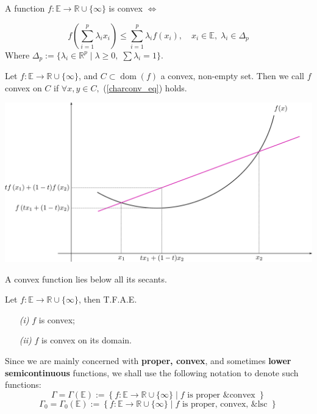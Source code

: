\documentclass{tufte-handout}
\DeclareMathOperator{\dom}{dom}
\begin{document}
{\begin{proposition}
 \end{proposition}
 \begin{proposition} \label{Jensens}
   A function $f: \mathbb{E} \to \mathbb{R} \cup \{ \infty \}$ is convex $\iff$  

   $$f \left( \sum^{p}_{i=1} \lambda_i x_i \right)\leq \sum^{p}_{i=1}\lambda_i f ( x_i), \quad x_i \in \mathbb{E},\; \lambda_i \in \Delta_p $$
  Where $\Delta_p :=\{ \lambda_i \in \mathbb{R}^p \mid \lambda \geq 0 , \; \sum \lambda_i = 1 \}$.
 \end{proposition}
 \begin{definition}
   Let $f: \mathbb{E}\to \mathbb{R} \cup \{\infty\}$, and $C \subset \dom(f)$ a convex, non-empty set. Then we call $f$ convex on $C$ if $\forall x, y \in C,$ (\ref{charconv_eq}) holds. 
\end{definition}
\begin{marginfigure}
  \includegraphics{convex}
  \caption{A convex function lies below all its secants.}
\end{marginfigure}
\begin{corollary} Let $f: \mathbb{E}\to \mathbb{R}\cup \{\infty\}$, then T.F.A.E. 
  \begin{enumerate}
    \item[\it (i)] $f$ is convex;
    \item[\it (ii)] $f$ is convex on its domain. 
  \end{enumerate} 
\end{corollary} 
\begin{remark}[Notation]
  Since we are mainly concerned with \textbf{proper, convex}, and sometimes \textbf{lower semicontinuous} functions, we shall use the following notation to denote such functions:
  $$\Gamma = \Gamma(\mathbb{E}) := \left\{ f: \mathbb{E} \to \mathbb{R} \cup \{\infty\} \mid f \text{ is proper \& convex } \right\} $$
  $$\Gamma_0 = \Gamma_0(\mathbb{E}) := \left\{ f: \mathbb{E} \to \mathbb{R} \cup \{\infty\} \mid f \text{ is proper, convex, \& lsc } \right\} $$


\end{remark}}
\end{document}
